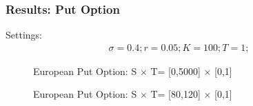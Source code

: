 \documentclass[blue]{beamer}
\begin{document}
\begin{frame}
\frametitle{Results: Put Option}
Settings:
\begin{align*}
\sigma = 0.4;
r = 0.05;
K = 100;
T = 1;
\end{align*}
	\centering
	\begin{figure}[H]
		\centering
		\begin{minipage}[t]{.45\linewidth}
			\caption{European Put Option: S $\times $ T= [0,5000] $\times $ [0,1]}
		\end{minipage}
		\begin{minipage}[t]{.45\linewidth}
			\caption{European Put Option: S $\times $ T= [80,120] $\times $ [0,1]}
		\end{minipage}
	\end{figure}
\end{frame}
\end{document}
